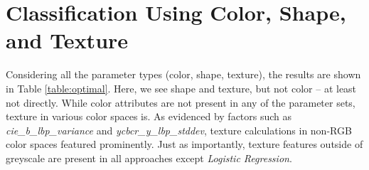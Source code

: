 \documentclass[letterpaper]{report}
\begin{document}
%
%
%

\section{Classification Using Color, Shape, and Texture}
Considering all the parameter types (color, shape, texture), the results are shown in Table \ref{table:optimal}. Here, we see shape and texture, but not color -- at least not directly. While color attributes are not present in any of the parameter sets, texture in various color spaces is. As evidenced by factors such as \textit{cie\_b\_lbp\_variance} and \textit{ycbcr\_y\_lbp\_stddev}, texture calculations in non-RGB color spaces featured prominently. Just as importantly, texture features outside of greyscale are present in all approaches except \textit{Logistic Regression}.
\end{document}
